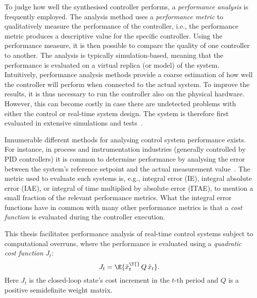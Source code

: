 To judge how well the synthesised controller performs, a \emph{performance analysis} is frequently employed.
The analysis method uses a \emph{performance metric} to qualitatively measure the performance of the controller, i.e., the performance metric produces a descriptive value for the specific controller.
Using the performance measure, it is then possible to compare the quality of one controller to another.
The analysis is typically simulation-based, meaning that the performance is evaluated on a virtual replica (or model) of the system.
Intuitively, performance analysis methods provide a coarse estimation of how well the controller will perform when connected to the actual system.
To improve the results, it is thus necessary to run the controller also on the physical hardware.
However, this can become costly in case there are undetected problems with either the control or real-time system design.
The system is therefore first evaluated in extensive simulations and tests~\cite{Mandrioli:2022}.

Innumerable different methods for analysing control system performance exists.
For instance, in process and instrumentation industries (generally controlled by PID controllers) it is common to determine performance by analysing the error between the system's reference setpoint and the actual measurement value~\cite{Panda:2012}.
The metric used to evaluate such systems is, e.g., integral error (IE), integral absolute error (IAE), or integral of time multiplied by absolute error (ITAE), to mention a small fraction of the relevant performance metrics.
What the integral error functions have in common with many other performance metrics is that a \emph{cost function} is evaluated during the controller execution.

This thesis facilitates performance analysis of real-time control systems subject to computational overruns, where the performance is evaluated using a \emph{quadratic cost function} $J_t$:
%
\begin{equation}%
    \label{eq:cost}%
    J_t = \E{\tilde{x}_t^\T{}\, Q\, \tilde{x}_t}.
\end{equation}
%
Here $J_t$ is the closed-loop state's cost increment in the $t$-th period and $Q$ is a positive semidefinite weight matrix.




